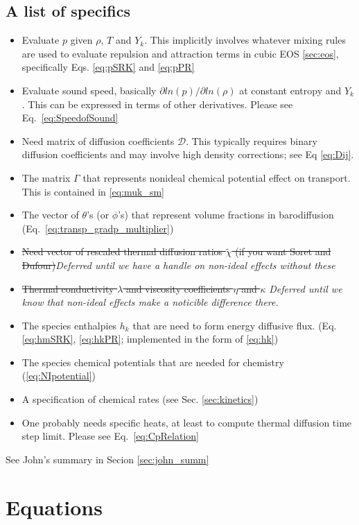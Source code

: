 \documentclass[11pt]{article}
\begin{document}
\subsection{A list of specifics}
\begin{itemize}
\item Evaluate $p$ given $\rho$, $T$ and $Y_k$. This implicitly involves whatever mixing rules are used to
    evaluate repulsion and attraction terms in cubic EOS \ref{sec:eos}, specifically Eqs. \ref{eq:pSRK} and \ref{eq:pPR}
\item Evaluate sound speed, basically $\partial ln(p)/ \partial ln(\rho)$ at constant entropy and $Y_k$. This
can be expressed in terms of other derivatives. Please see Eq.~\ref{eq:SpeedofSound}
\item Need matrix of diffusion coefficients $\mathcal{D}$.  This typically requires binary diffusion coefficients and may involve high density corrections; see Eq \ref{eq:Dij}.
\item The matrix $\Gamma$ that represents nonideal chemical potential effect on transport. This is contained in \ref{eq:muk_sm}
\item The vector of $\theta$'s (or $\phi$'s) that represent volume fractions in barodiffusion (Eq.~\ref{eq:transp_gradp_multiplier})
\item \sout{Need vector of rescaled thermal diffusion ratios $\tilde{\chi}$ (if you want Soret and Dufour)}{\it Deferred until we have a handle on non-ideal effects without these}
\item \sout{Thermal conductivity $\lambda$ and viscosity coefficients $\eta$ and $\kappa$} {\it Deferred until we know that non-ideal effects make a noticible difference there.}
\item The species enthalpies $h_k$ that are need to form energy diffusive flux. (Eq. \ref{eq:hmSRK}, \ref{eq:hkPR}; implemented in the form of \ref{eq:hk})
\item The species chemical potentials that are needed for chemistry (\ref{eq:NIpotential})
\item A specification of chemical rates (see Sec. \ref{sec:kinetics})
\item One probably needs specific heats, at least to compute thermal diffusion time step limit. Please see Eq.~\ref{eq:CpRelation}
\end{itemize}

See John's summary in Secion \ref{sec:john_summ}



\section{Equations}
\end{document}
